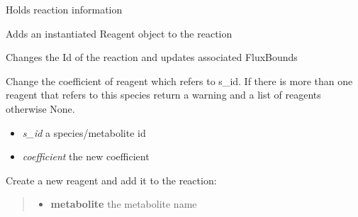 \documentclass[a4paper,11pt,english]{sphinxmanual}
\begin{document}

\begin{fulllineitems}
\label{modules_doc:cbmpy.CBModel.Reaction}
Holds reaction information

\begin{fulllineitems}
\label{modules_doc:cbmpy.CBModel.Reaction.addReagent}
Adds an instantiated Reagent object to the reaction

\end{fulllineitems}


\begin{fulllineitems}
\label{modules_doc:cbmpy.CBModel.Reaction.changeId}
Changes the Id of the reaction and updates associated FluxBounds

\end{fulllineitems}


\begin{fulllineitems}
\label{modules_doc:cbmpy.CBModel.Reaction.changeReagentCoefficientForSpecies}
Change the coefficient of reagent which refers to s\_id. If there is more than one reagent that refers
to this species return a warning and a list of reagents otherwise None.
\begin{itemize}
\item {} 
\emph{s\_id} a species/metabolite id

\item {} 
\emph{coefficient} the new coefficient

\end{itemize}

\end{fulllineitems}


\begin{fulllineitems}
\label{modules_doc:cbmpy.CBModel.Reaction.createReagent}
Create a new reagent and add it to the reaction:
\begin{quote}
\begin{itemize}
\item {} 
\textbf{metabolite} the metabolite name


\end{itemize}
\end{quote}
\end{fulllineitems}
\end{fulllineitems}
\end{document}
